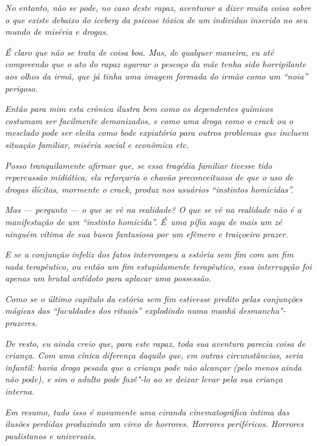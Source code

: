 \emph{No entanto, não se pode, no caso deste rapaz, aventurar a dizer
muita coisa sobre o que existe debaixo do iceberg da psicose tóxica de
um indivíduo inserido no seu mundo de miséria e drogas.}~

\emph{É claro que não se trata de coisa boa. Mas, de qualquer maneira,
eu até compreendo que o ato do rapaz agarrar o pescoço da mãe tenha sido
horripilante aos olhos da irmã, que já tinha uma imagem formada do irmão
como um ``noia'' perigoso.}~

\emph{Então para mim esta crônica ilustra bem como os dependentes
químicos costumam ser facilmente demonizados, e como uma droga como o
crack ou o mesclado pode ser eleita como bode expiatório para outros
problemas que incluem situação familiar, miséria social e econômica
etc.}~

\emph{Posso tranquilamente afirmar que, se essa tragédia familiar
tivesse tido repercussão midiática, ela reforçaria o chavão
preconceituoso de que o uso de drogas ilícitas, mormente o crack, produz
nos usuários ``instintos homicidas''.}~

\emph{Mas --- pergunto --- o que se vê na realidade? O que se vê na
realidade não é a manifestação de um ``instinto homicida''. É~uma pífia
saga de mais um zé ninguém vítima de sua busca fantasiosa por um efêmero
e traiçoeiro prazer.}~

\emph{E se a conjunção infeliz dos fatos interrompeu a estória sem fim
com um fim nada terapêutico, ou então um fim estupidamente terapêutico,
essa interrupção foi apenas um brutal antídoto para aplacar uma
possessão.}~

\emph{Como se o último capítulo da estória sem fim estivesse predito
pelas conjunções mágicas das ``faculdades dos rituais'' explodindo numa
manhã desmancha"-prazeres.}~

\emph{De resto, eu ainda creio que, para este rapaz, toda sua aventura
parecia coisa de criança. Com uma cínica diferença daquilo que, em
outras circunstâncias, seria infantil: havia droga pesada que a criança
pode não alcançar (pelo menos ainda não pode), e sim o adulto pode
fazê"-lo ao se deixar levar pela sua criança interna.}~

\emph{Em resumo, tudo isso é novamente uma ciranda cinematográfica
íntima das ilusões perdidas produzindo um circo de horrores. Horrores
periféricos. Horrores paulistanos e universais.~}

